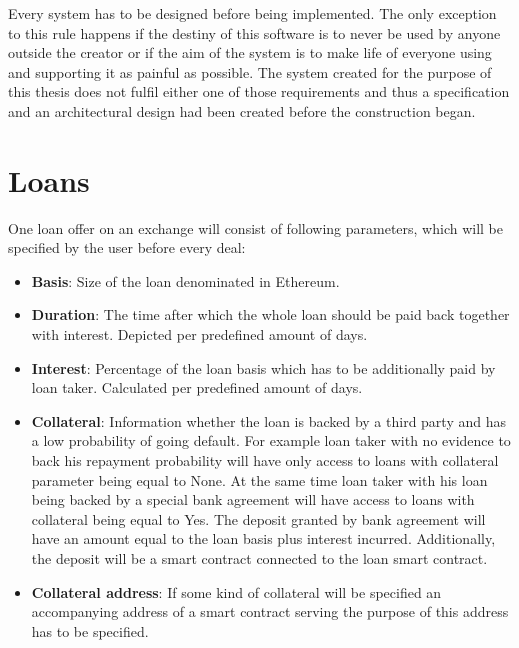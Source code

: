 \documentclass[a4paper,12pt,twoside,openany]{report}
\begin{document}
Every system has to be designed before being implemented. The only exception to this rule happens if the destiny of this software is to never be used by anyone outside the creator or if the aim of the system is to make life of everyone using and supporting it as painful as possible. The system created for the purpose of this thesis does not fulfil either one of those requirements and thus a specification and an architectural design had been created before the construction  began.

\section{Loans} \label{loans}
One loan offer on an exchange will consist of following parameters, which will be specified by the user before every deal:
\begin{itemize}
\item \textbf{Basis}: Size of the loan denominated in Ethereum.
\item \textbf{Duration}: The time after which the whole loan should be paid back together with interest. Depicted per predefined amount of days.
\item \textbf{Interest}: Percentage of the loan basis which has to be additionally paid by loan taker. Calculated per predefined amount of days.
\item \textbf{Collateral}: Information whether the loan is backed by a third party and has a low probability of going default. For example loan taker with no evidence to back his repayment probability will have only access to loans with collateral parameter being equal to None. At the same time loan taker with his loan being backed by a special bank agreement will have access to loans with collateral being equal to Yes. The deposit granted by bank agreement will have an amount equal to the loan basis plus interest incurred. Additionally, the deposit will be a smart contract connected to the loan smart contract.
\item \textbf{Collateral address}: If some kind of collateral will be specified an accompanying address of a smart contract serving the purpose of this address has to be specified. 
\end{itemize}
\end{document}
